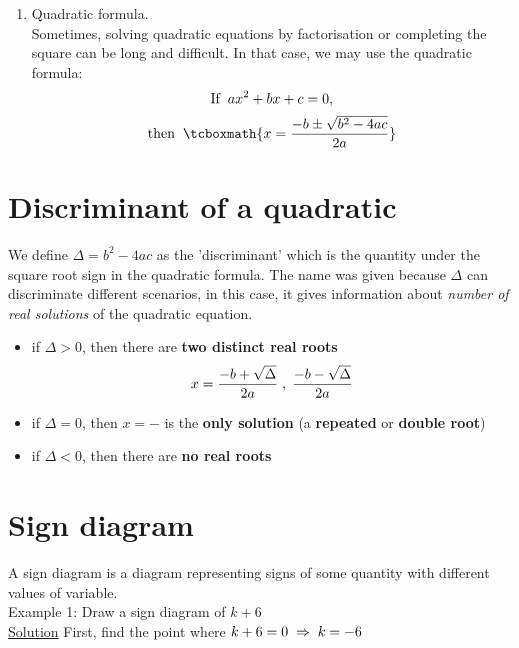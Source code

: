 \documentclass[11pt]{article}
\begin{document}
\begin{enumerate}
    \item Quadratic formula.\\
    Sometimes, solving quadratic equations by factorisation or completing the square can be long and difficult. In that case, we may use the quadratic formula:
    \begin{equation*}
        \text{If} \hspace{2mm} ax^2+bx+c=0,
    \end{equation*}
    \begin{equation*}
        \text{then} \hspace{2mm} \tcboxmath{x=\frac{-b \pm \sqrt{b^2-4ac}}{2a}}
    \end{equation*}
\end{enumerate} 

\section{Discriminant of a quadratic}
We define $\Delta = b^2-4ac$ as the 'discriminant' which is the quantity under the square root sign in the quadratic formula. The name was given because $\Delta$ can discriminate different scenarios, in this case, it gives information about \emph{number of real solutions} of the quadratic equation.
\begin{itemize}
    \item if $\Delta >0$, then there are \textbf{two distinct real roots}
    \begin{equation*}
        x=\frac{-b + \sqrt{\Delta}}{2a} \hspace{1mm}, \hspace{1mm} \frac{-b - \sqrt{\Delta}}{2a}
    \end{equation*}
    \item if $\Delta=0$, then $x=-$ is the \textbf{only solution} (a \textbf{repeated} or \textbf{double root})
    \item if $\Delta<0$, then there are \textbf{no real roots}
\end{itemize}
\newpage
\section{Sign diagram}
A sign diagram is a diagram representing signs of some quantity with different values of variable.
\vspace{3mm} \\ Example 1: Draw a sign diagram of $k+6$
\vspace{1mm}\\ \underline{Solution} \hspace{2.5mm} First, find the point where $k+6=0 \hspace{1mm} \Rightarrow \hspace{1mm} k=-6$
\end{document}
